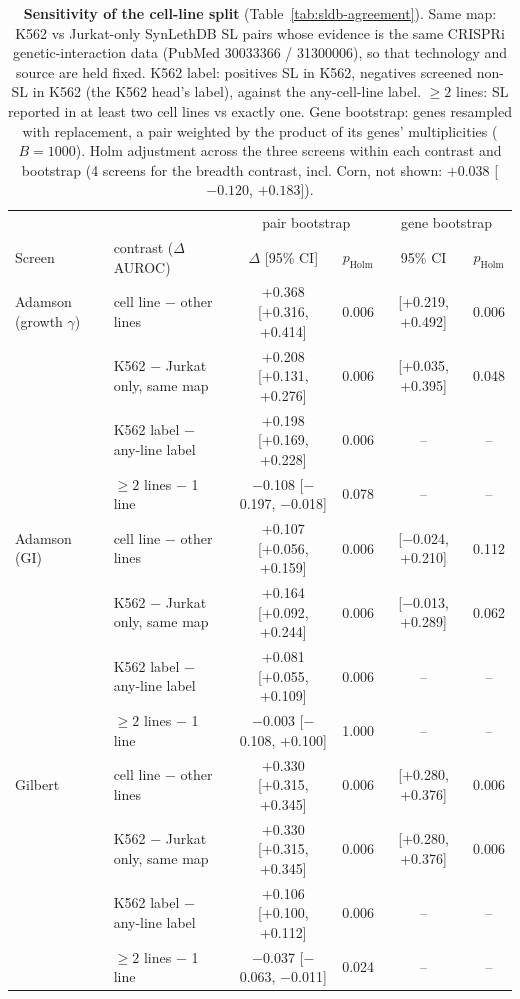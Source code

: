 \begin{table}[t]
\centering
\small
\begin{tabular}{ll|cc|cc}
\hline
 & & \multicolumn{2}{c|}{pair bootstrap} & \multicolumn{2}{c}{gene bootstrap} \\
Screen & contrast ($\Delta$ AUROC) & $\Delta$ [95\% CI] & $p_{\mathrm{Holm}}$ & 95\% CI & $p_{\mathrm{Holm}}$ \\
\hline
Adamson (growth $\gamma$) & cell line $-$ other lines & +0.368 [+0.316, +0.414] & 0.006 & [+0.219, +0.492] & 0.006 \\
 & K562 $-$ Jurkat only, same map & +0.208 [+0.131, +0.276] & 0.006 & [+0.035, +0.395] & 0.048 \\
 & K562 label $-$ any-line label & +0.198 [+0.169, +0.228] & 0.006 & -- & -- \\
 & $\ge 2$ lines $-$ 1 line & $-$0.108 [$-$0.197, $-$0.018] & 0.078 & -- & -- \\
\hline
Adamson (GI) & cell line $-$ other lines & +0.107 [+0.056, +0.159] & 0.006 & [$-$0.024, +0.210] & 0.112 \\
 & K562 $-$ Jurkat only, same map & +0.164 [+0.092, +0.244] & 0.006 & [$-$0.013, +0.289] & 0.062 \\
 & K562 label $-$ any-line label & +0.081 [+0.055, +0.109] & 0.006 & -- & -- \\
 & $\ge 2$ lines $-$ 1 line & $-$0.003 [$-$0.108, +0.100] & 1.000 & -- & -- \\
\hline
Gilbert & cell line $-$ other lines & +0.330 [+0.315, +0.345] & 0.006 & [+0.280, +0.376] & 0.006 \\
 & K562 $-$ Jurkat only, same map & +0.330 [+0.315, +0.345] & 0.006 & [+0.280, +0.376] & 0.006 \\
 & K562 label $-$ any-line label & +0.106 [+0.100, +0.112] & 0.006 & -- & -- \\
 & $\ge 2$ lines $-$ 1 line & $-$0.037 [$-$0.063, $-$0.011] & 0.024 & -- & -- \\
\hline
\end{tabular}
\caption{\textbf{Sensitivity of the cell-line split} (Table~\ref{tab:sldb-agreement}). Same map: K562 vs Jurkat-only SynLethDB SL pairs whose evidence is the same CRISPRi genetic-interaction data (PubMed 30033366 / 31300006), so that technology and source are held fixed. K562 label: positives SL in K562, negatives screened non-SL in K562 (the K562 head's label), against the any-cell-line label. $\ge 2$ lines: SL reported in at least two cell lines vs exactly one. Gene bootstrap: genes resampled with replacement, a pair weighted by the product of its genes' multiplicities ($B=1000$). Holm adjustment across the three screens within each contrast and bootstrap (4 screens for the breadth contrast, incl. Corn, not shown: $+0.038$ [$-0.120$, $+0.183$]).}
\label{tab:sldb-agreement-sens}
\end{table}

